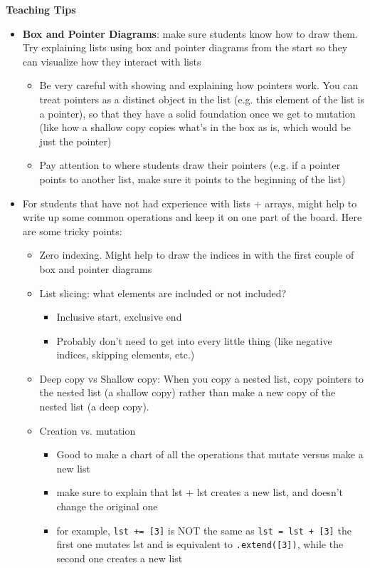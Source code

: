 \begin{blocksection}
	\begin{guide}
	\textbf{Teaching Tips}
	\begin{itemize}
			\item \textbf{Box and Pointer Diagrams}: make sure students know how to draw them. Try explaining lists using box and pointer diagrams from the start so they can visualize how they interact with lists
			\begin{itemize}
				\item Be very careful with showing and explaining how pointers work. You can treat pointers as a distinct object in the list (e.g. this element of the list is a pointer), so that they have a solid foundation once we get to mutation (like how a shallow copy copies what’s in the box as is, which would be just the pointer)
				\item Pay attention to where students draw their pointers (e.g. if a pointer points to another list, make sure it points to the beginning of the list)
			\end{itemize}
			\item For students that have not had experience with lists + arrays, might help to write up some common operations and keep it on one part of the board. Here are some tricky points:
			\begin{itemize}
				\item Zero indexing. Might help to draw the indices in with the first couple of box and pointer diagrams
				\item List slicing: what elements are included or not included?
				\begin{itemize}
					\item Inclusive start, exclusive end
					\item Probably don’t need to get into every little thing (like negative indices, skipping elements, etc.) 
				\end{itemize}
				\item Deep copy vs Shallow copy: When you copy a nested list, copy pointers to the nested list (a shallow copy)  rather than make a new copy of the nested list (a deep copy).
				\item Creation vs. mutation
				\begin{itemize}
					\item Good to make a chart of all the operations that mutate versus make a new list
					\item make sure to explain that lst + lst creates a new list, and doesn’t change the original one
					\item for example, \texttt{lst += [3]} is NOT the same as \texttt{lst = lst + [3]}
					the first one mutates lst and is equivalent to \texttt{.extend([3])}, while the second one creates a new list
				\end{itemize}
			\end{itemize}
	\end{itemize}
	\end{guide}
\end{blocksection}

